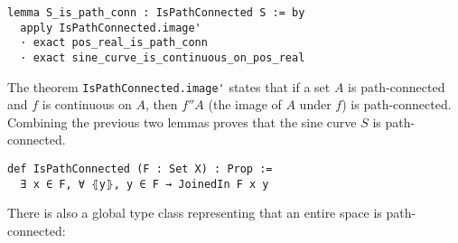 
\begin{lstlisting}[language=lean]
lemma S_is_path_conn : IsPathConnected S := by
  apply IsPathConnected.image'
  · exact pos_real_is_path_conn
  · exact sine_curve_is_continuous_on_pos_real
\end{lstlisting}

The theorem \lstinline[language=lean]|IsPathConnected.image'| states that if a set $A$ is path-connected
and $f$ is continuous on $A$, then $f''A$ (the image of $A$ under $f$) is path-connected.
Combining the previous two lemmas proves that the sine curve $S$ is path-connected.

\begin{lstlisting}[language=lean]
def IsPathConnected (F : Set X) : Prop :=
  ∃ x ∈ F, ∀ ⦃y⦄, y ∈ F → JoinedIn F x y
\end{lstlisting}




There is also a global type class representing that an entire space is path-connected:

